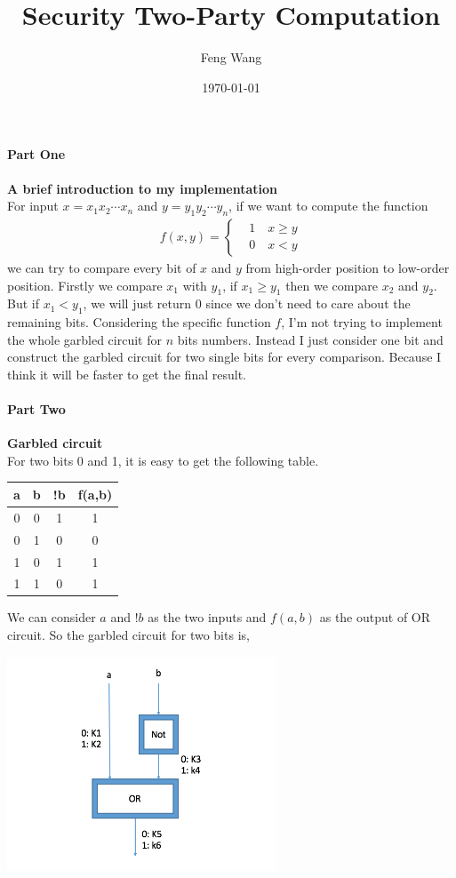 \documentclass[11pt]{article}
\title{Security Two-Party Computation}
\date{\today}
\author{Feng Wang}
\begin{document}
\maketitle
\paragraph{Part One}{\textbf{A brief introduction to my implementation}}\vspace{2ex}\\
For input $x = x_1x_2\cdots x_n$ and $y= y_1y_2\cdots y_n$, if we want to compute the function 
\begin{align*}
	f(x,y) = \begin{cases}
		&1 \quad x\geq y \\
		&0 \quad x < y
	\end{cases}
\end{align*}
we can try to compare every bit of $x$ and $y$ from high-order position to low-order position. Firstly we compare $x_1$ with $y_1$, if $x_1 \geq y_1$ then we compare $x_2$ and $y_2$. But if $x_1 < y_1$, we will just return 0 since we don't need to care about the remaining bits. Considering the specific function $f$, I'm not trying to implement the whole garbled circuit for $n$ bits numbers. Instead I just consider one bit and construct the garbled circuit for two single bits for every comparison. Because I think it will be faster to get the final result.
\paragraph{Part Two}{\textbf{Garbled circuit}}\vspace{2ex}\\
For two bits 0 and 1, it is easy to get the following table. \\
\begin{center}
\begin{tabular}{c|c|c|c}
	\hline
	a & b & !b & f(a,b) \\
	\hline
	0 & 0 & 1 & 1 \\
	\hline
	0 & 1 & 0 & 0 \\
	\hline 
	1 & 0 & 1 & 1 \\
	\hline
	1 & 1 & 0 & 1 \\
	\hline
\end{tabular} 
\end{center}
\vspace{2ex}
We can consider $a$ and $!b$ as the two inputs and $f(a,b)$ as the output of OR circuit. So the garbled circuit for two bits is,\\
\centerline{\includegraphics[width=0.6\textwidth]{circuit}}
\end{document}
